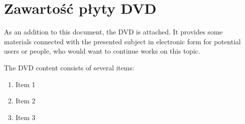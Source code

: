 \chapter{Zawartość płyty DVD}

As an addition to this document, the DVD is attached. It provides some materials connected with the presented subject in electronic form for potential users or people, who would want to continue works on this topic. 

The DVD content consists of several items:

\begin{enumerate}
\item Item 1
\item Item 2
\item Item 3
\end{enumerate}

